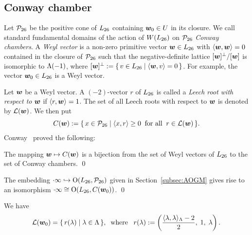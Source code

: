 \documentclass{amsart} %
\begin{document}
\subsection{Conway chamber}\label{subsec:ConwayChamber}
%
Let $\mathord{\mathcal{P}}_{26}$ be the 
positive cone of $L_{26}$ 
containing $\boldsymbol{w}_0\in U$ in its closure.
We call standard fundamental domains of the action of $W(L_{26})$ on $\mathord{\mathcal{P}}_{26}$ 
\emph{Conway chambers}.
A \emph{Weyl vector} is a non-zero primitive vector $\boldsymbol{w} \in L_{26}$
with $\langle \boldsymbol{w} , \boldsymbol{w}  \rangle=0$ contained in 
the closure of $\mathord{\mathcal{P}}_{26}$ such that
the negative-definite lattice $[\boldsymbol{w} ]^{\perp}/[\boldsymbol{w} ]$ is isomorphic to $\Lambda(-1)$,
where $[\boldsymbol{w} ]^{\perp}:=\{\,{v\in L_{26}}\mid {\langle \boldsymbol{w}, v \rangle=0} \,\}$.
For example, the vector $\boldsymbol{w}_0\in L_{26}$ is a Weyl vector.
%
\par
Let $\boldsymbol{w} $ be a Weyl vector.
A $(-2)$-vector $r$ of $L_{26}$ is called a \emph{Leech root with respect to $\boldsymbol{w} $} if $\langle r, \boldsymbol{w}  \rangle=1$.
The set of all Leech roots with respect to $\boldsymbol{w} $ is denoted by $\mathord{\mathcal{L}}(\boldsymbol{w} )$.
We then put
\[
\mathord{C}(\boldsymbol{w} ):=\{\,{x\in\mathord{\mathcal{P}}_{26}}\mid {\langle x, r \rangle\ge 0\;\;\textrm{for all}\;\; r\in \mathord{\mathcal{L}}(\boldsymbol{w})} \,\}.
\]
%
Conway~\cite{MR690711} proved the following:
%
\begin{theorem}[Conway]
The mapping $\boldsymbol{w} \mapsto \mathord{C}(\boldsymbol{w})$ is a bijection from the set of Weyl vectors of $L_{26}$ to
the set of Conway chambers.
\qed
\end{theorem}
%
\begin{corollary}
The embedding $\cdot \infty\hookrightarrow \mathord{\mathrm{O}}(L_{26}, \mathord{\mathcal{P}}_{26})$ given in Section~\ref{subsec:AOGM} 
gives rise to an isomorphism 
$\cdot \infty\cong \mathord{\mathrm{O}}(L_{26}, \mathord{C}(\boldsymbol{w}_0))$.
\qed
\end{corollary}
%
We have 
\begin{equation}\label{eq:Leechrootlambda}
\mathord{\mathcal{L}}(\boldsymbol{w}_0)=\{\,{r(\lambda)}\mid {\lambda\in \Lambda} \,\},
\;\;\textrm{where}\;\;\; r(\lambda):=\left(\frac{\langle \lambda, \lambda \rangle_{\Lambda}-2}{2}, \; 1,\; \lambda\right).
\end{equation}
%
%
\end{document}
